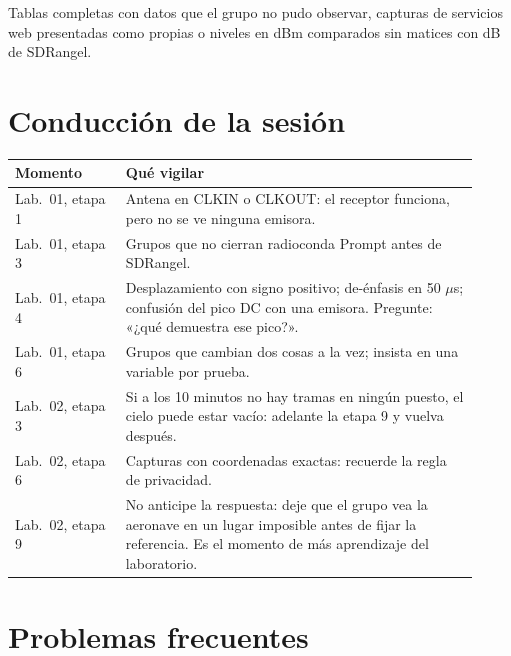 \begin{importante}
Tablas completas con datos que el grupo no pudo observar, capturas de servicios web presentadas como propias o niveles en dBm comparados sin matices con dB de SDRangel.
\end{importante}

\section{Conducción de la sesión}

\begin{longtable}{@{}>{\raggedright\arraybackslash}p{0.22\linewidth}>{\raggedright\arraybackslash}p{0.70\linewidth}@{}}
\toprule
\textbf{Momento} & \textbf{Qué vigilar} \\
\midrule
\endhead
Lab.\ 01, etapa 1 & Antena en CLKIN o CLKOUT: el receptor funciona, pero no se ve ninguna emisora. \\
Lab.\ 01, etapa 3 & Grupos que no cierran radioconda Prompt antes de SDRangel. \\
Lab.\ 01, etapa 4 & Desplazamiento con signo positivo; de-énfasis en 50 $\mu$s; confusión del pico DC con una emisora. Pregunte: «¿qué demuestra ese pico?». \\
Lab.\ 01, etapa 6 & Grupos que cambian dos cosas a la vez; insista en una variable por prueba. \\
Lab.\ 02, etapa 3 & Si a los 10 minutos no hay tramas en ningún puesto, el cielo puede estar vacío: adelante la etapa 9 y vuelva después. \\
Lab.\ 02, etapa 6 & Capturas con coordenadas exactas: recuerde la regla de privacidad. \\
Lab.\ 02, etapa 9 & No anticipe la respuesta: deje que el grupo vea la aeronave en un lugar imposible antes de fijar la referencia. Es el momento de más aprendizaje del laboratorio. \\
\bottomrule
\end{longtable}

\section{Problemas frecuentes}

